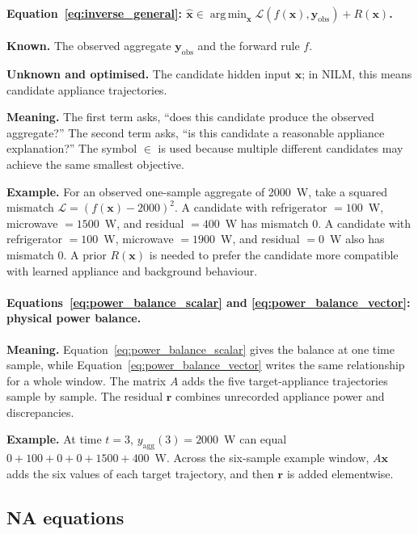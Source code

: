 \documentclass[11pt]{article}
\newcommand{\vect}[1]{\mathbf{#1}}
\begin{document}
\paragraph{Equation~\eqref{eq:inverse_general}: $\hat{\vect{x}}\in\operatorname*{arg\,min}_{\vect{x}}\mathcal{L}(f(\vect{x}),\vect{y}_{\mathrm{obs}})+R(\vect{x})$.}
\textbf{Known.} The observed aggregate $\vect{y}_{\mathrm{obs}}$ and the forward rule $f$.

\textbf{Unknown and optimised.} The candidate hidden input $\vect{x}$; in NILM, this means candidate appliance trajectories.

\textbf{Meaning.} The first term asks, ``does this candidate produce the observed aggregate?'' The second term asks, ``is this candidate a reasonable appliance explanation?'' The symbol $\in$ is used because multiple different candidates may achieve the same smallest objective.

\textbf{Example.} For an observed one-sample aggregate of 2000~W, take a squared mismatch $\mathcal{L}=(f(\vect{x})-2000)^2$. A candidate with refrigerator $=100$~W, microwave $=1500$~W, and residual $=400$~W has mismatch $0$. A candidate with refrigerator $=100$~W, microwave $=1900$~W, and residual $=0$~W also has mismatch $0$. A prior $R(\vect{x})$ is needed to prefer the candidate more compatible with learned appliance and background behaviour.

\paragraph{Equations~\eqref{eq:power_balance_scalar} and \eqref{eq:power_balance_vector}: physical power balance.}
\textbf{Meaning.} Equation~\eqref{eq:power_balance_scalar} gives the balance at one time sample, while Equation~\eqref{eq:power_balance_vector} writes the same relationship for a whole window. The matrix $A$ adds the five target-appliance trajectories sample by sample. The residual $\vect{r}$ combines unrecorded appliance power and discrepancies.

\textbf{Example.} At time $t=3$, $y_{\mathrm{agg}}(3)=2000$~W can equal $0+100+0+0+1500+400$~W. Across the six-sample example window, $A\vect{x}$ adds the six values of each target trajectory, and then $\vect{r}$ is added elementwise.

\subsection{NA equations}
\end{document}
